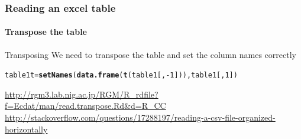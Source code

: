 \documentclass[12pt]{beamer}\usepackage[]{graphicx}\usepackage[]{color}
\makeatletter
\newcommand{\hlnum}[1]{\textcolor[rgb]{0.686,0.059,0.569}{#1}}%
\newcommand{\hlopt}[1]{\textcolor[rgb]{0,0,0}{#1}}%
\newcommand{\hlstd}[1]{\textcolor[rgb]{0.345,0.345,0.345}{#1}}%
\newcommand{\hlkwb}[1]{\textcolor[rgb]{0.69,0.353,0.396}{#1}}%
\newcommand{\hlkwd}[1]{\textcolor[rgb]{0.737,0.353,0.396}{\textbf{#1}}}%
\newenvironment{kframe}{%
 \def\at@end@of@kframe{}%
 \ifinner\ifhmode%
  \def\at@end@of@kframe{\end{minipage}}%
  \begin{minipage}{\columnwidth}%
 \fi\fi%
 \def\FrameCommand##1{\hskip\@totalleftmargin \hskip-\fboxsep
 \colorbox{shadecolor}{##1}\hskip-\fboxsep
     \hskip-\linewidth \hskip-\@totalleftmargin \hskip\columnwidth}%
 \MakeFramed {\advance\hsize-\width
   \@totalleftmargin\z@ \linewidth\hsize
   \@setminipage}}%
 {\par\unskip\endMakeFramed%
 \at@end@of@kframe}
\newenvironment{knitrout}{}{} %
\makeatother
\begin{document}
\begin{frame}[fragile]
  \frametitle{Reading an excel table}
  \framesubtitle{Transpose the table}
  \begin{block}{Transposing}
  We need to transpose the table and set the column names correctly
  \end{block}
\begin{knitrout}
\color{fgcolor}\begin{kframe}
\begin{alltt}
\hlstd{table1t}\hlkwb{=}\hlkwd{setNames}\hlstd{(}\hlkwd{data.frame}\hlstd{(}\hlkwd{t}\hlstd{(table1[,}\hlopt{-}\hlnum{1}\hlstd{])),table1[,}\hlnum{1}\hlstd{])}
\end{alltt}
\end{kframe}
\end{knitrout}
\url{http://rgm3.lab.nig.ac.jp/RGM/R_rdfile?f=Ecdat/man/read.transpose.Rd&d=R_CC}
\url{http://stackoverflow.com/questions/17288197/reading-a-csv-file-organized-horizontally}
\end{frame}
\end{document}
